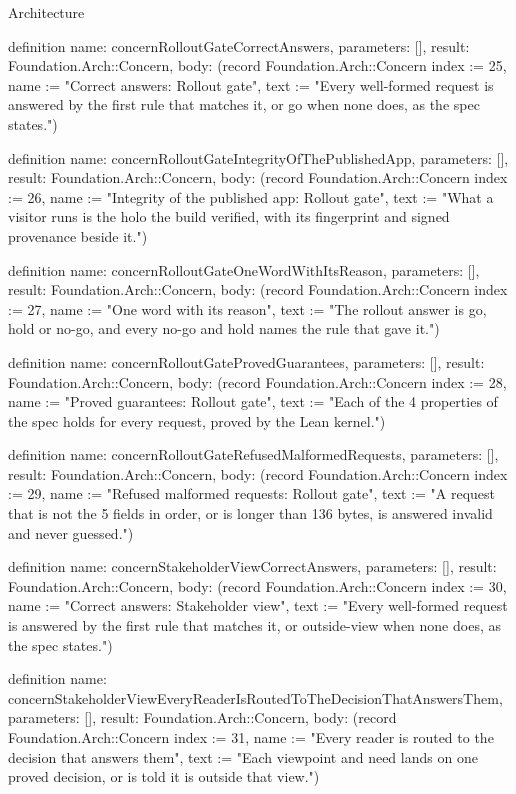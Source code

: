 \begin{lexlean}{Architecture}
\begin{semanticmodule}
definition{
  name: concernRolloutGateCorrectAnswers,
  parameters: [],
  result: Foundation.Arch::Concern,
  body: (record Foundation.Arch::Concern {index := 25, name := "Correct answers: Rollout gate", text := "Every well-formed request is answered by the first rule that matches it, or go when none does, as the spec states."})
}

definition{
  name: concernRolloutGateIntegrityOfThePublishedApp,
  parameters: [],
  result: Foundation.Arch::Concern,
  body: (record Foundation.Arch::Concern {index := 26, name := "Integrity of the published app: Rollout gate", text := "What a visitor runs is the holo the build verified, with its fingerprint and signed provenance beside it."})
}

definition{
  name: concernRolloutGateOneWordWithItsReason,
  parameters: [],
  result: Foundation.Arch::Concern,
  body: (record Foundation.Arch::Concern {index := 27, name := "One word with its reason", text := "The rollout answer is go, hold or no-go, and every no-go and hold names the rule that gave it."})
}

definition{
  name: concernRolloutGateProvedGuarantees,
  parameters: [],
  result: Foundation.Arch::Concern,
  body: (record Foundation.Arch::Concern {index := 28, name := "Proved guarantees: Rollout gate", text := "Each of the 4 properties of the spec holds for every request, proved by the Lean kernel."})
}

definition{
  name: concernRolloutGateRefusedMalformedRequests,
  parameters: [],
  result: Foundation.Arch::Concern,
  body: (record Foundation.Arch::Concern {index := 29, name := "Refused malformed requests: Rollout gate", text := "A request that is not the 5 fields in order, or is longer than 136 bytes, is answered invalid and never guessed."})
}

definition{
  name: concernStakeholderViewCorrectAnswers,
  parameters: [],
  result: Foundation.Arch::Concern,
  body: (record Foundation.Arch::Concern {index := 30, name := "Correct answers: Stakeholder view", text := "Every well-formed request is answered by the first rule that matches it, or outside-view when none does, as the spec states."})
}

definition{
  name: concernStakeholderViewEveryReaderIsRoutedToTheDecisionThatAnswersThem,
  parameters: [],
  result: Foundation.Arch::Concern,
  body: (record Foundation.Arch::Concern {index := 31, name := "Every reader is routed to the decision that answers them", text := "Each viewpoint and need lands on one proved decision, or is told it is outside that view."})
}


\end{semanticmodule}
\end{lexlean}

